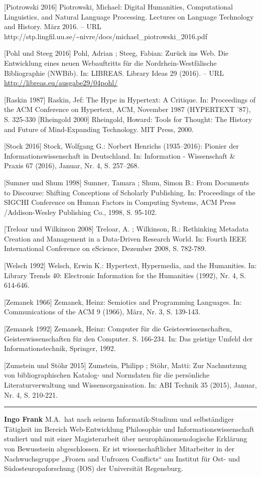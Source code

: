 \documentclass[a4paper,
fontsize=11pt,
oneside,
numbers=noperiodatend,
parskip=half-,
bibliography=totoc,
final
]{scrartcl}
\begin{document}
{[}Piotrowski 2016{]} Piotrowski, Michael: Digital Humanities,
Computational Linguistics, and Natural Language Processing. Lectures on
Language Technology and History. März 2016. -- URL
http://stp.lingfil.uu.se/\textasciitilde{}nivre/docs/michael\_piotrowski\_2016.pdf

{[}Pohl und Steeg 2016{]} Pohl, Adrian ; Steeg, Fabian: Zurück ins Web.
Die Entwicklung eines neuen Webauftritts für die Nordrhein-Westfälische
Bibliographie (NWBib). In: LIBREAS. Library Ideas 29 (2016). -- URL
\url{http://libreas.eu/ausgabe29/04pohl/}

{[}Raskin 1987{]} Raskin, Jef: The Hype in Hypertext: A Critique. In:
Proceedings of the ACM Conference on Hypertext, ACM, November 1987
(HYPERTEXT '87), S. 325-330 {[}Rheingold 2000{]} Rheingold, Howard:
Tools for Thought: The History and Future of Mind-Expanding Technology.
MIT Press, 2000.

{[}Stock 2016{]} Stock, Wolfgang G.: Norbert Henrichs (1935--2016):
Pionier der Informationswissenschaft in Deutschland. In: Information -
Wissenschaft \& Praxis 67 (2016), Januar, Nr. 4, S. 257--268.

{[}Sumner und Shum 1998{]} Sumner, Tamara ; Shum, Simon B.: From
Documents to Discourse: Shifting Conceptions of Scholarly Publishing.
In: Proceedings of the SIGCHI Conference on Human Factors in Computing
Systems, ACM Press /Addison-Wesley Publishing Co., 1998, S. 95-102.

{[}Treloar und Wilkinson 2008{]} Treloar, A. ; Wilkinson, R.: Rethinking
Metadata Creation and Management in a Data-Driven Research World. In:
Fourth IEEE International Conference on eScience, Dezember 2008, S.
782-789.

{[}Welsch 1992{]} Welsch, Erwin K.: Hypertext, Hypermedia, and the
Humanities. In: Library Trends 40: Electronic Information for the
Humanities (1992), Nr. 4, S. 614-646.

{[}Zemanek 1966{]} Zemanek, Heinz: Semiotics and Programming Languages.
In: Communications of the ACM 9 (1966), März, Nr. 3, S. 139-143.

{[}Zemanek 1992{]} Zemanek, Heinz: Computer für die
Geisteswissenschaften, Geisteswissenschaften für den Computer. S.
166-234. In: Das geistige Umfeld der Informationstechnik, Springer,
1992.

{[}Zumstein und Stöhr 2015{]} Zumstein, Philipp ; Stöhr, Matti: Zur
Nachnutzung von bibliographischen Katalog- und Normdaten für die
persönliche Literaturverwaltung und Wissensorganisation. In: ABI Technik
35 (2015), Januar, Nr. 4, S. 210-221.

\begin{center}\rule{0.5\linewidth}{\linethickness}\end{center}

\textbf{Ingo Frank} M.A.~hat nach seinem Informatik-Studium und
selbständiger Tätigkeit im Bereich Web-Entwicklung Philosophie und
Informationswissenschaft studiert und mit einer Magisterarbeit über
neurophänomenologische Erklärung von Bewusstsein abgeschlossen. Er ist
wissenschaftlicher Mitarbeiter in der Nachwuchsgruppe „Frozen and
Unfrozen Conflicts`` am Institut für Ost- und Südosteuropaforschung
(IOS) der Universität Regensburg.
\end{document}
